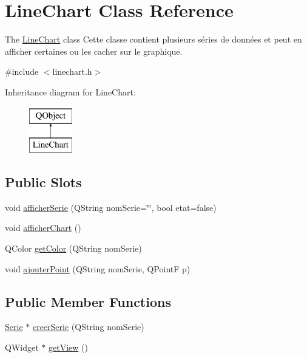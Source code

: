 \hypertarget{classLineChart}{\section{Line\-Chart Class Reference}
\label{classLineChart}
}


The \hyperlink{classLineChart}{Line\-Chart} class Cette classe contient plusieurs séries de données et peut en afficher certaines ou les cacher sur le graphique.  




{\ttfamily \#include $<$linechart.\-h$>$}

Inheritance diagram for Line\-Chart\-:\begin{figure}[H]
\begin{center}
\leavevmode
\includegraphics[height=2.000000cm]{classLineChart}
\end{center}
\end{figure}
\subsection*{Public Slots}
\begin{DoxyCompactItemize}
\item 
void \hyperlink{classLineChart_a63ff5fee1da8841e5959340669171393}{afficher\-Serie} (Q\-String nom\-Serie=\char`\"{}\char`\"{}, bool etat=false)
\item 
void \hyperlink{classLineChart_aeb7e88d90e0f6d4b52a9666839d50c35}{afficher\-Chart} ()
\item 
Q\-Color \hyperlink{classLineChart_a54618e9127e50edb4dbbbb269d422b0b}{get\-Color} (Q\-String nom\-Serie)
\item 
void \hyperlink{classLineChart_a4e468707e84690bd16a7d2b67485e745}{ajouter\-Point} (Q\-String nom\-Serie, Q\-Point\-F p)
\end{DoxyCompactItemize}
\subsection*{Public Member Functions}
\begin{DoxyCompactItemize}
\item 
\hyperlink{classSerie}{Serie} $\ast$ \hyperlink{classLineChart_add6b4014bd10e5e703f34901c305870a}{creer\-Serie} (Q\-String nom\-Serie)
\item 
Q\-Widget $\ast$ \hyperlink{classLineChart_a2e8faf97bbbb4dd5b8f50039725ce26d}{get\-View} ()
\end{DoxyCompactItemize}



